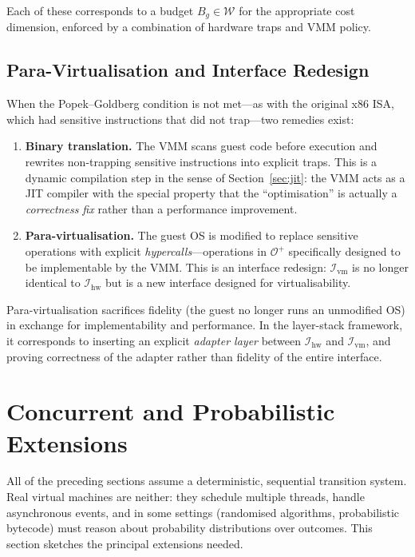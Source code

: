 \documentclass[11pt, a4paper]{article}
\theoremstyle{definition}
\theoremstyle{plain}
\theoremstyle{remark}
\begin{document}
Each of these corresponds to a budget $B_g \in \mathcal{W}$ for the
appropriate cost dimension, enforced by a combination of hardware traps and
VMM policy.

\subsection{Para-Virtualisation and Interface Redesign}

When the Popek--Goldberg condition is not met---as with the original x86
ISA, which had sensitive instructions that did not trap---two remedies
exist:

\begin{enumerate}
  \item \textbf{Binary translation.} The VMM scans guest code before
        execution and rewrites non-trapping sensitive instructions into
        explicit traps. This is a dynamic compilation step in the sense of
        Section~\ref{sec:jit}: the VMM acts as a JIT compiler with the
        special property that the ``optimisation'' is actually a
        \emph{correctness fix} rather than a performance improvement.
  \item \textbf{Para-virtualisation.} The guest OS is modified to replace
        sensitive operations with explicit \emph{hypercalls}---operations
        in $\mathcal{O}^{+}$ specifically designed to be implementable by
        the VMM. This is an interface redesign: $\mathcal{I}_{\mathrm{vm}}$
        is no longer identical to $\mathcal{I}_{\mathrm{hw}}$ but is a new
        interface designed for virtualisability.
\end{enumerate}

Para-virtualisation sacrifices fidelity (the guest no longer runs an
unmodified OS) in exchange for implementability and performance. In the
layer-stack framework, it corresponds to inserting an explicit
\emph{adapter layer} between $\mathcal{I}_{\mathrm{hw}}$ and
$\mathcal{I}_{\mathrm{vm}}$, and proving correctness of the adapter
rather than fidelity of the entire interface.


\section{Concurrent and Probabilistic Extensions}
\label{sec:concurrent}

All of the preceding sections assume a deterministic, sequential transition
system. Real virtual machines are neither: they schedule multiple threads,
handle asynchronous events, and in some settings (randomised algorithms,
probabilistic bytecode) must reason about probability distributions over
outcomes. This section sketches the principal extensions needed.
\end{document}
